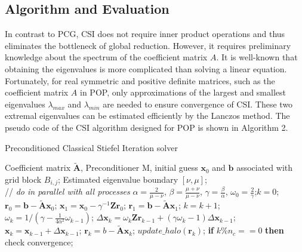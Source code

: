 \documentclass{sig-alternate}
\begin{document}
\subsection{Algorithm and Evaluation}
In contrast to PCG, CSI does not require inner product operations and thus eliminates the bottleneck of global reduction. However, it requires preliminary knowledge about the spectrum of the coefficient matrix $A$. It is well-known that obtaining the eigenvalues is more complicated than solving a linear equation. Fortunately,
for real symmetric and positive definite  matrices, such as the coefficient matrix $A$ in POP,
only approximations of the largest and smallest eigenvalues $\lambda_{max}$ and $\lambda_{min}$ are needed to ensure convergence of CSI. These two extremal eigenvalues can be estimated efficiently by the Lanczos method. The pseudo code of the CSI algorithm designed for POP is shown in Algorithm 2.


\begin{algorithm}[h]
\caption{Preconditioned Classical Stiefel Iteration solver}
\label{alg:pcsi}
\begin{algorithmic}[1]
\REQUIRE Coefficient matrix $\tilde{\textbf{A}}$, Preconditioner  M, initial guess  $\textbf{x}_0$ and $\textbf{b}$ associated with grid block $B_{i,j}$; Estimated eigenvalue boundary $[\nu,\mu]$;  \\
 // \qquad    \textit{do in parallel with all processes}
\STATE $\alpha =\frac{2}{\mu -\nu}$, $ \beta = \frac{\mu +\nu}{\mu -\nu}$, $\gamma = \frac{\beta}{\alpha}$, $\omega_0 =\frac{ 2}{\gamma}$;\quad $k = 0$;
\STATE $\textbf{r}_0 = \textbf{b}-\tilde{\textbf{A}}\textbf{x}_0$; $\textbf{x}_1 =\textbf{x}_0 -\gamma^{-1}\textbf{Zr}_0$; $\textbf{r}_1 =\textbf{b} -\tilde{\textbf{A}}\textbf{x}_1$;
\STATE $k=k+1$;\quad $\omega_k = 1/(\gamma - \frac{1}{4\alpha^2}\omega_{k-1})$; 
\STATE $\Delta \textbf{x}_{k} =\omega_k\textbf{Zr}_{k-1}+(\gamma \omega_k-1)\Delta \textbf{x}_{k-1}$;
\STATE $\textbf{x}_{k} =\textbf{x}_{k-1}+\Delta \textbf{x}_{k-1}$; \quad  $\textbf{r}_{k} =b- \tilde{\textbf{A}}\textbf{x}_{k}$;
\STATE $update\_halo(\textbf{r}_k)$; 
\STATE \textbf{if} $k \%  n_{c} == 0$ \textbf{then}  check convergence;
\ENDWHILE
\end{algorithmic}
\end{algorithm}
\end{document}

